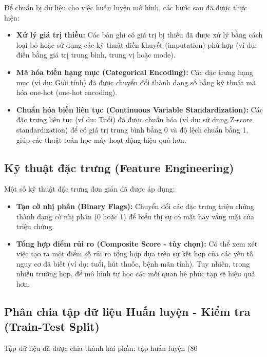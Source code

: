 Để chuẩn bị dữ liệu cho việc huấn luyện mô hình, các bước sau đã được thực hiện:
\begin{itemize}
    \item \textbf{Xử lý giá trị thiếu:} Các bản ghi có giá trị bị thiếu đã được xử lý bằng cách loại bỏ hoặc sử dụng các kỹ thuật điền khuyết (imputation) phù hợp (ví dụ: điền bằng giá trị trung bình, trung vị hoặc mode).
    \item \textbf{Mã hóa biến hạng mục (Categorical Encoding):} Các đặc trưng hạng mục (ví dụ: Giới tính) đã được chuyển đổi thành dạng số bằng kỹ thuật mã hóa one-hot (one-hot encoding).
    \item \textbf{Chuẩn hóa biến liên tục (Continuous Variable Standardization):} Các đặc trưng liên tục (ví dụ: Tuổi) đã được chuẩn hóa (ví dụ: sử dụng Z-score standardization) để có giá trị trung bình bằng 0 và độ lệch chuẩn bằng 1, giúp các thuật toán học máy hoạt động hiệu quả hơn.
\end{itemize}

\subsection{Kỹ thuật đặc trưng (Feature Engineering)}

Một số kỹ thuật đặc trưng đơn giản đã được áp dụng:
\begin{itemize}
    \item \textbf{Tạo cờ nhị phân (Binary Flags):} Chuyển đổi các đặc trưng triệu chứng thành dạng cờ nhị phân (0 hoặc 1) để biểu thị sự có mặt hay vắng mặt của triệu chứng.
    \item \textbf{Tổng hợp điểm rủi ro (Composite Score - tùy chọn):} Có thể xem xét việc tạo ra một điểm số rủi ro tổng hợp dựa trên sự kết hợp của các yếu tố nguy cơ đã biết (ví dụ: tuổi, hút thuốc, bệnh mãn tính). Tuy nhiên, trong nhiều trường hợp, để mô hình tự học các mối quan hệ phức tạp sẽ hiệu quả hơn.
\end{itemize}

\subsection{Phân chia tập dữ liệu Huấn luyện - Kiểm tra (Train-Test Split)}

Tập dữ liệu đã được chia thành hai phần: tập huấn luyện (80%
